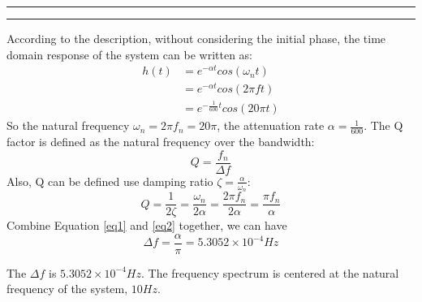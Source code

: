 \documentclass[11pt]{article}
\newcounter{questionCounter}
\newcounter{partCounter}[questionCounter]
\newenvironment{question}[2][\arabic{questionCounter}]{%
    \addtocounter{questionCounter}{1}%
    \setcounter{partCounter}{0}%
    \vspace{.25in} \hrule \vspace{0.5em}%
        \noindent{\bf #2}%
    \vspace{0.8em} \hrule \vspace{.10in}%
}{}
\begin{document}
\begin{question}{Problem 3}
According to the description, without considering the initial phase, the time domain response of the system can be written as:
\begin{align*}
    h(t) &= e^{-\alpha t}cos(\omega_{n} t) \\
    &= e^{-\alpha t}cos(2 \pi f t) \\
    &= e^{-\frac{1}{600}t}cos(20 \pi t)
\end{align*}
So the natural frequency $\omega_{n} = 2\pi f_{n}= 20\pi$, the attenuation rate $\alpha = \frac{1}{600}$.
The Q factor is defined as the natural frequency over the bandwidth:
\begin{equation}\label{eq1}
    Q = \frac{f_{n}}{\Delta f}
\end{equation}
Also, Q can be defined use damping ratio $\zeta = \frac{\alpha}{\omega_{n}}$:
\begin{equation}\label{eq2}
    Q = \frac{1}{2\zeta} = \frac{\omega_{n}}{2\alpha} = \frac{2\pi f_{n}}{2\alpha} = \frac{\pi f_{n}}{\alpha}
\end{equation}
Combine Equation \ref{eq1} and \ref{eq2} together, we can have
\begin{equation}
    \Delta f = \frac{\alpha}{\pi} = 5.3052 \times 10^{-4} Hz
\end{equation}

The $\Delta f$ is $5.3052 \times 10^{-4} Hz$. The frequency spectrum is centered at the natural frequency of the system, $10 Hz$.


\end{question}
\end{document}
